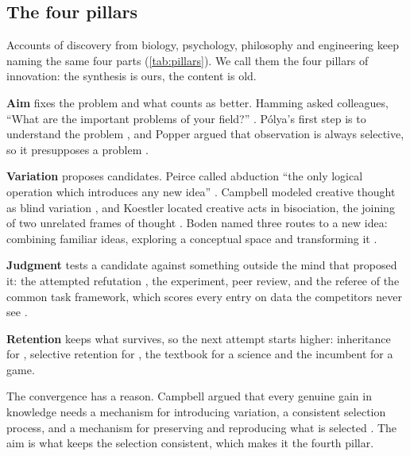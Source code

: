 \subsection{The four pillars}\label{sub:anatomy-pillars}

Accounts of discovery from biology, psychology, philosophy and engineering keep naming the same four parts (\cref{tab:pillars}). We call them the four pillars of innovation: the synthesis is ours, the content is old.

\textbf{Aim} fixes the problem and what counts as better. Hamming asked colleagues, ``What are the important problems of your field?'' \citep{hamming1986research}. Pólya's first step is to understand the problem \citep{polya1945solve}, and Popper argued that observation is always selective, so it presupposes a problem \citep{popper1963conjectures}.

\textbf{Variation} proposes candidates. Peirce called abduction ``the only logical operation which introduces any new idea'' \citep[CP~5.171]{peirce1934cp}. Campbell modeled creative thought as blind variation \citep{campbell1960bvsr,simonton2011bvsr}, and Koestler located creative acts in bisociation, the joining of two unrelated frames of thought \citep{koestler1964act}. Boden named three routes to a new idea: combining familiar ideas, exploring a conceptual space and transforming it \citep{boden1998creativity}.

\textbf{Judgment} tests a candidate against something outside the mind that proposed it: the attempted refutation \citep{popper1959logic}, the experiment, peer review, and the referee of the common task framework, which scores every entry on data the competitors never see \citep{donoho2017fifty}.

\textbf{Retention} keeps what survives, so the next attempt starts higher: inheritance for \citet{darwin1859origin}, selective retention for \citet{campbell1960bvsr}, the textbook for a science and the incumbent for a game.

The convergence has a reason. Campbell argued that every genuine gain in knowledge needs a mechanism for introducing variation, a consistent selection process, and a mechanism for preserving and reproducing what is selected \citep[p.~381]{campbell1960bvsr}. The aim is what keeps the selection consistent, which makes it the fourth pillar.


